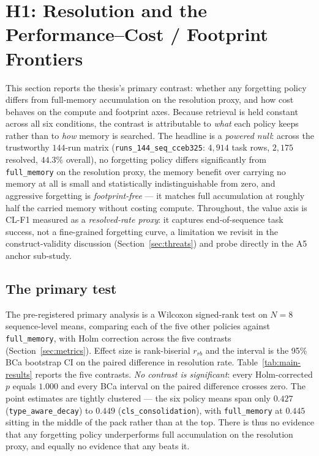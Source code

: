 
\section{H1: Resolution and the Performance--Cost / Footprint Frontiers}
\label{sec:h1}

This section reports the thesis's primary contrast: whether any forgetting policy differs
from full-memory accumulation on the resolution proxy, and how cost behaves on the compute
and footprint axes. Because retrieval is held constant across all six conditions, the
contrast is attributable to \emph{what} each policy keeps rather than to \emph{how} memory
is searched. The headline is a \emph{powered null}: across the trustworthy
$144$-run matrix (\texttt{runs\_144\_seq\_cceb325}: $4{,}914$ task rows, $2{,}175$
resolved, $44.3\%$ overall), no forgetting policy differs significantly from
\texttt{full\_memory} on the resolution proxy, the memory benefit over carrying no memory
at all is small and statistically indistinguishable from zero, and aggressive forgetting is
\emph{footprint-free} --- it matches full accumulation at roughly half the carried memory
without costing compute. Throughout, the value axis is CL-F1 measured as a
\emph{resolved-rate proxy}: it captures end-of-sequence task success, not a fine-grained
forgetting curve, a limitation we revisit in the construct-validity discussion
(Section~\ref{sec:threats}) and probe directly in the A5 anchor sub-study.

\subsection{The primary test}

The pre-registered primary analysis is a Wilcoxon signed-rank test on $N=8$
sequence-level means, comparing each of the five other policies against
\texttt{full\_memory}, with Holm correction across the five contrasts
(Section~\ref{sec:metrics}). Effect size is rank-biserial $r_{rb}$ and the interval is the
95\% BCa bootstrap CI on the paired difference in resolution rate.
Table~\ref{tab:main-results} reports the five contrasts. \emph{No contrast is
significant}: every Holm-corrected $p$ equals $1.000$ and every BCa interval on the paired
difference crosses zero. The point estimates are tightly clustered --- the six policy means
span only $0.427$ (\texttt{type\_aware\_decay}) to $0.449$ (\texttt{cls\_consolidation}),
with \texttt{full\_memory} at $0.445$ sitting in the middle of the pack rather than at the
top. There is thus no evidence that any forgetting policy underperforms full accumulation
on the resolution proxy, and equally no evidence that any beats it.

